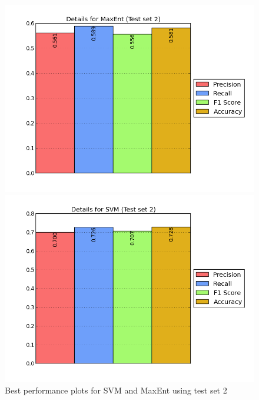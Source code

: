 \begin{figure}[htb]
	\centering
	\begin{minipage}{.45\linewidth}
		\includegraphics[width=\linewidth]{../img/plots/analysis/maxent_stats_best_diff_test.png}
	\end{minipage}
	\hspace{0.05\linewidth}
	\begin{minipage}{.45\linewidth}
		\includegraphics[width=\linewidth]{../img/plots/analysis/svm_stats_best_diff_test.png}
	\end{minipage}
	\caption[Best performance plots for SVM and MaxEnt for test set 2]{Best performance plots for SVM and MaxEnt using test set 2}
	\label{fig:best_result_testset2}
\end{figure}

